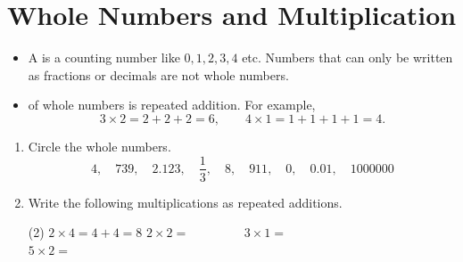 \documentclass[12pt]{article}
\newcounter{exercisenum}
\newenvironment{exercises}{%
  \begin{tcolorbox}[colback=white,colframe=black,arc=0pt,breakable]
  \begin{enumerate}[label=\arabic*),leftmargin=1cm,resume=exercises]
  \setcounter{enumi}{\value{exercisenum}}
}{%
  \setcounter{exercisenum}{\value{enumi}}
  \end{enumerate}
  \end{tcolorbox}
}
\begin{document}
\thispagestyle{firstpage}

\section{Whole Numbers and Multiplication}
\begin{itemize}
\item
A  is a counting number like $0,1,2,3,4$ etc. Numbers that can only be written as fractions or decimals are not whole numbers.
\item
{} of whole numbers is repeated addition. For example,
\begin{equation*}
3\times 2 = 2 + 2 + 2 = 6, \quad\quad
4\times 1 = 1+1+1+1 = 4.
\end{equation*}
\end{itemize}

\begin{exercises}
\item
Circle the whole numbers.
$$4,\quad 739,\quad 2.123, \quad \frac{1}{3},\quad 8, \quad 911, \quad 0, \quad 0.01, \quad 1000000$$
\item
Write the following multiplications as repeated additions.
\begin{tasks}(2)
\task $2\times 4 = 4+4 = 8$
\task $2\times 2 = \phantom{2+2=4}$
\task $3\times 1 = \phantom{1+1+1=3}$
\task $5\times 2 = \phantom{2+2+2+2+2=10}$
\end{tasks}
\end{exercises}
\end{document}
